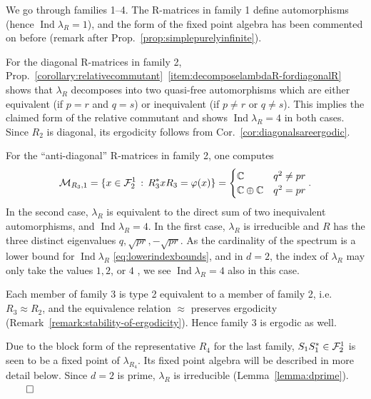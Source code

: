 \documentclass[12pt,a4paper]{amsart}
\numberwithin{equation}{section}
\theoremstyle{remark}
\def\Ind{\operatorname{Ind}}
\def\C{\mathbb{C}}
\newcommand{\la}{\lambda}
\newcommand{\CM}[0]{\mathcal{M}} \newcommand{\CN}[0]{\mathcal{N}}
\def\Nsim{\approx}
\begin{document}
\bigskip 

 We go through families 1--4. The R-matrices in family 1 define automorphisms (hence $\Ind\la_R=1$), and the form of the fixed point algebra has been commented on before (remark after Prop.~\ref{prop:simplepurelyinfinite}). 

For the diagonal R-matrices in family 2, Prop.~\ref{corollary:relativecommutant}~\ref{item:decomposelambdaR-fordiagonalR} shows that $\la_R$ decomposes into two quasi-free automorphisms which are either equivalent (if $p=r$ and $q=s$) or inequivalent (if $p\neq r$ or $q\neq s$). This implies the claimed form of the relative commutant and shows $\Ind\la_R=4$ in both cases. Since $R_2$ is diagonal, its ergodicity follows from Cor.~\ref{cor:diagonalsareergodic}.

For the ``anti-diagonal'' R-matrices in family 2, one computes
\begin{align*}
 \CM_{R_3,1}=
 \{x\in\CF_2^1\,:\,R_3^*xR_3=\varphi(x)\}
 =
 \begin{cases}
  \C & q^2 \neq pr\\
  \C\oplus\C & q^2 =pr
 \end{cases}.
\end{align*}
In the second case, $\la_R$ is equivalent to the direct sum of two inequivalent automorphisms, and $\Ind\la_R=4$. In the first case, $\la_R$ is irreducible and $R$ has the three distinct eigenvalues $q,\sqrt{pr},-\sqrt{pr}$. As the cardinality of the spectrum is a lower bound for $\Ind\la_R$ \eqref{eq:lowerindexbounds}, and in $d=2$, the index of $\la_R$ may only take the values $1,2$, or $4$ \cite[Prop.~9.9]{ContiPinzari:1996}, we see $\Ind\la_R=4$ also in this case. 

Each member of family 3 is type 2 equivalent to a member of family 2, i.e. $R_3\Nsim R_2$, and the equivalence relation $\Nsim$ preserves ergodicity (Remark~\ref{remark:stability-of-ergodicity}). Hence family 3 is ergodic as well.

Due to the block form of the representative $R_4$ for the last family, $S_1S_1^*\in\mathcal{F}_2^1$ is seen to be a fixed point of $\la_{R_4}$. Its fixed point algebra will be described in more detail below. Since $d=2$ is prime, $\la_R$ is irreducible (Lemma~\ref{lemma:dprime}).\hfill$\qed$

\smallskip
\end{document}
